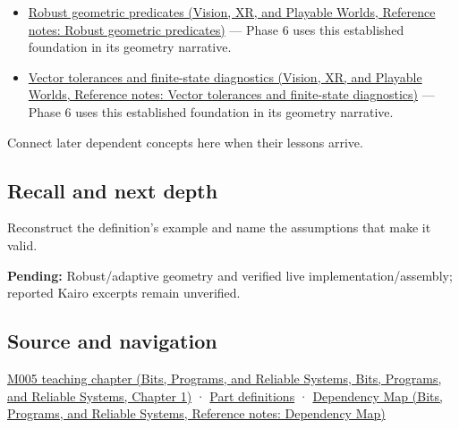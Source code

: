 \begin{itemize}
\tightlist
\item
  \href{../07-Vision-XR-and-Playable-Worlds/main.pdf\#nameddest=appendix-341296fb3f64}{Robust geometric predicates (Vision, XR, and Playable Worlds, Reference notes: Robust geometric predicates)} --- Phase 6 uses this established foundation in its geometry narrative.
\item
  \href{../07-Vision-XR-and-Playable-Worlds/main.pdf\#nameddest=appendix-b5b83329215b}{Vector tolerances and finite-state diagnostics (Vision, XR, and Playable Worlds, Reference notes: Vector tolerances and finite-state diagnostics)} --- Phase 6 uses this established foundation in its geometry narrative.
\end{itemize}

Connect later dependent concepts here when their lessons arrive.

\subsection{Recall and next depth}\label{appendix-5aef4f13483a-recall-and-next-depth}

Reconstruct the definition's example and name the assumptions that make it valid.

\textbf{Pending:} Robust/adaptive geometry and verified live implementation/assembly; reported Kairo excerpts remain unverified.

\subsection{Source and navigation}\label{appendix-5aef4f13483a-source-and-navigation}

\href{../01-Bits-Programs-and-Reliable-Systems/main.pdf\#nameddest=01-foundations-i-ch001-when-arithmetic-meets-uncertainty}{M005 teaching chapter (Bits, Programs, and Reliable Systems, Bits, Programs, and Reliable Systems, Chapter 1)} · \hyperref[appendix-fd090d982a15-m005---parts-77-88]{Part definitions} · \href{../01-Bits-Programs-and-Reliable-Systems/main.pdf\#nameddest=appendix-4ad47bdd269a}{Dependency Map (Bits, Programs, and Reliable Systems, Reference notes: Dependency Map)}
